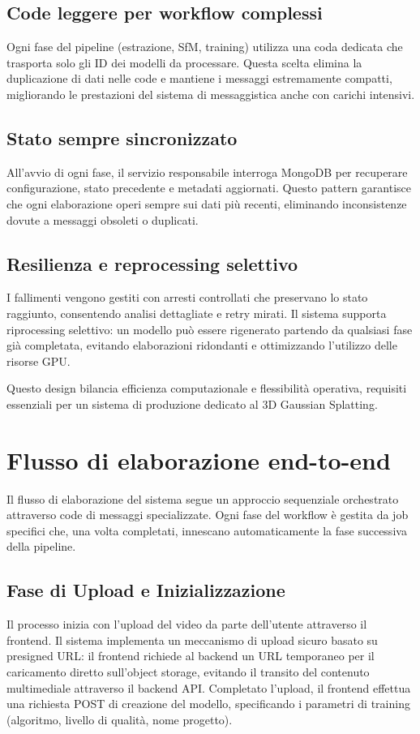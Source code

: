 \subsection{Code leggere per workflow complessi}
Ogni fase del pipeline (estrazione, SfM, training) utilizza una coda dedicata che trasporta solo gli ID dei modelli da processare. Questa scelta elimina la duplicazione di dati nelle code e mantiene i messaggi estremamente compatti, migliorando le prestazioni del sistema di messaggistica anche con carichi intensivi.

\subsection{Stato sempre sincronizzato}
All'avvio di ogni fase, il servizio responsabile interroga MongoDB per recuperare configurazione, stato precedente e metadati aggiornati. Questo pattern garantisce che ogni elaborazione operi sempre sui dati più recenti, eliminando inconsistenze dovute a messaggi obsoleti o duplicati.

\subsection{Resilienza e reprocessing selettivo}
I fallimenti vengono gestiti con arresti controllati che preservano lo stato raggiunto, consentendo analisi dettagliate e retry mirati. Il sistema supporta riprocessing selettivo: un modello può essere rigenerato partendo da qualsiasi fase già completata, evitando elaborazioni ridondanti e ottimizzando l'utilizzo delle risorse GPU.

Questo design bilancia efficienza computazionale e flessibilità operativa, requisiti essenziali per un sistema di produzione dedicato al 3D Gaussian Splatting.

\section{Flusso di elaborazione end-to-end}
Il flusso di elaborazione del sistema segue un approccio sequenziale orchestrato attraverso code di messaggi specializzate. Ogni fase del workflow è gestita da job specifici che, una volta completati, innescano automaticamente la fase successiva della pipeline.
\subsection{Fase di Upload e Inizializzazione}
Il processo inizia con l'upload del video da parte dell'utente attraverso il frontend. Il sistema implementa un meccanismo di upload sicuro basato su presigned URL: il frontend richiede al backend un URL temporaneo per il caricamento diretto sull'object storage, evitando il transito del contenuto multimediale attraverso il backend API. Completato l'upload, il frontend effettua una richiesta POST di creazione del modello, specificando i parametri di training (algoritmo, livello di qualità, nome progetto).
